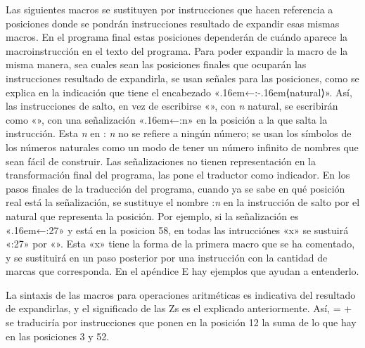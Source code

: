 Las siguientes macros se sustituyen por instrucciones que hacen referencia a posiciones donde se
pondrán instrucciones resultado de expandir esas mismas macros. En el programa final estas
posiciones dependerán de cuándo aparece la macroinstrucción en el texto del programa. Para poder
expandir la macro de la misma manera, sea cuales sean las posiciones finales que ocuparán las
instrucciones resultado de expandirla, se usan señales para las posiciones, como se explica en la
indicación que tiene el encabezado «{\kern.16em←\fcode:\kern-.16em⟨natural⟩}». Así, las
instrucciones de salto, en vez de escribirse «\estrella{}», con {\it n} natural,
se escribirán como «\estrella{}», con una señalización
«\kern.16em←{:\fcodenoterm n}» en la posición a la que salta la instrucción. Esta {\it n} en {:\it
n} no se refiere a ningún número; se usan los símbolos de los números naturales como un modo de
tener un número infinito de nombres que sean fácil de construir. Las señalizaciones no tienen
representación en la transformación final del programa, las pone el traductor como indicador. En los
pasos finales de la traducción del programa, cuando ya se sabe en qué posición real está la
señalización, se sustituye el nombre {:\it n} en la instrucción de salto por el natural que
representa la posición. Por ejemplo, si la señalización es «\kern.16em←{\fcode:27}» y está en la
posicion 58, en todas las intrucciónes «{\fcodenoterm x}{}» se sustuirá «{\fcode:27}» por
«{}». Esta «{\fcodenoterm x}{}»  tiene la forma de la primera macro que se ha
comentado, y se sustituirá en un paso posterior por una instrucción con la cantidad de marcas que
corresponda. En el apéndice E hay ejemplos que ayudan a entenderlo.

%
La sintaxis de las macros para operaciones aritméticas es indicativa del resultado de expandirlas, y
el significado de las {\fcode Z} s es el explicado anteriormente. Así,%
\vskip-2pt\encaje
{} =  + 
\finencaje
se traduciría por instrucciones que ponen en la posición 12 la suma de lo que hay en las posiciones 3 y 52.

